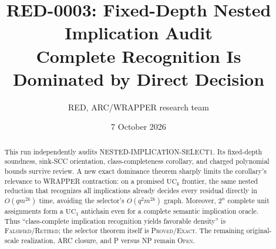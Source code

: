 \documentclass[11pt]{article}
\title{RED-0003: Fixed-Depth Nested Implication Audit\\
Complete Recognition Is Dominated by Direct Decision}
\author{RED, ARC/WRAPPER research team}
\date{7 October 2026}
\begin{document}
\maketitle

\begin{abstract}
This run independently audits NESTED-IMPLICATION-SELECT1.  Its fixed-depth
soundness, sink-SCC orientation, class-completeness corollary, and charged
polynomial bounds survive review.  A new exact dominance theorem sharply
limits the corollary's relevance to WRAPPER contraction: on a promised
$\mathrm{UC}_k$ frontier, the same nested reduction that recognizes all
implications already decides every residual directly in
$O(qm^{2k})$ time, avoiding the selector's $O(q^2m^{2k})$ graph.  Moreover,
$2^n$ complete unit assignments form a $\mathrm{UC}_1$ antichain even for a
complete semantic implication oracle.  Thus ``class-complete implication
recognition yields favorable density'' is \textsc{Falsified/Retired}; the
selector theorem itself is \textsc{Proved/Exact}.  The remaining original-
scale realization, ARC closure, and P versus NP remain \textsc{Open}.
\end{abstract}
\end{document}
